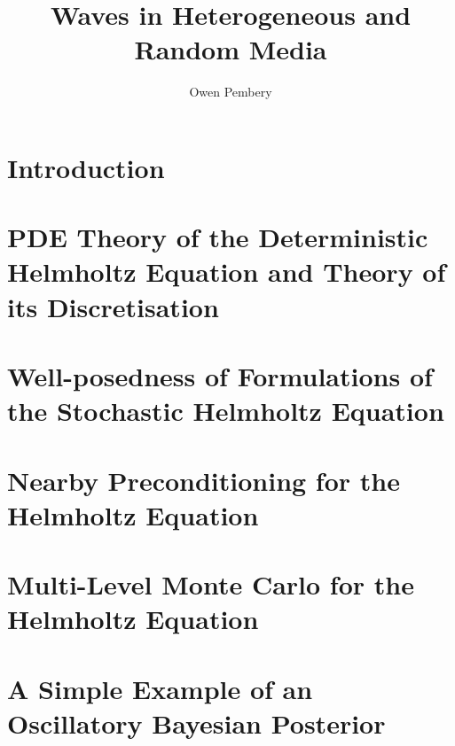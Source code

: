 \documentclass{report}
\title{Waves in Heterogeneous and Random Media}
\author{Owen Pembery}
\begin{document}
\maketitle

\chapter{Introduction}\label{chap:intro}


\chapter{PDE Theory of the Deterministic Helmholtz Equation and Theory of its Discretisation}\label{chap:background}


\chapter{Well-posedness of Formulations of the Stochastic Helmholtz Equation}\label{chap:stochastic}

\chapter{Nearby Preconditioning for the Helmholtz Equation}\label{chap:nbpc}


\chapter{Multi-Level Monte Carlo for the Helmholtz Equation}\label{chap:mlmc}

\appendix

\chapter{A Simple Example of an Oscillatory Bayesian Posterior}\label{app:osc}




\end{document}
